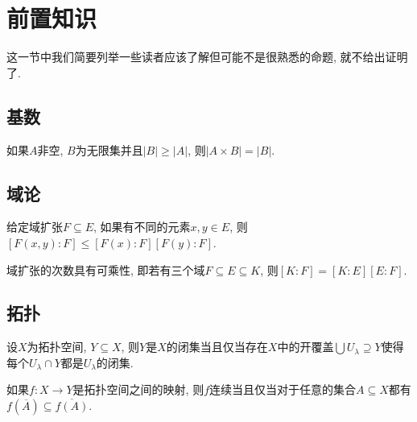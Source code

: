 
\section{前置知识}

这一节中我们简要列举一些读者应该了解但可能不是很熟悉的命题, 就不给出证明了.

\subsection{基数}

\begin{proposition}\label{prop:cardcartcor}
  如果$A$非空, $B$为无限集并且$\vert B\vert\geq \vert A\vert$, 则$\vert A\times B\vert=\vert B\vert$.
\end{proposition}

\subsection{域论}

\begin{proposition}\label{thm:fntfieldextdegree}%
  给定域扩张$F\subseteq E$, 如果有不同的元素$x, y\in E$, 则$[F(x, y):F]\leq [F(x):F][F(y):F]$.
\end{proposition}

\begin{theorem}\label{thm:fieldextdegreemulti}%
  域扩张的次数具有可乘性, 即若有三个域$F\subseteq E\subseteq K$, 则$[K:F]=[K:E][E:F]$.
\end{theorem}

\subsection{拓扑}

\begin{proposition}\label{prop:closedsetlocal}
  设$X$为拓扑空间, $Y\subseteq X$, 则$Y$是$X$的闭集当且仅当存在$X$中的开覆盖$\bigcup U_\lambda\supseteq Y$使得每个$U_\lambda\cap Y$都是$U_\lambda$的闭集.
\end{proposition}

\begin{proposition}\label{prop:continuousimageclosure}
  如果$f\colon X\to Y$是拓扑空间之间的映射, 则$f$连续当且仅当对于任意的集合$A\subseteq X$都有$f(\overline{A})\subseteq\overline{f(A)}$.
\end{proposition}

